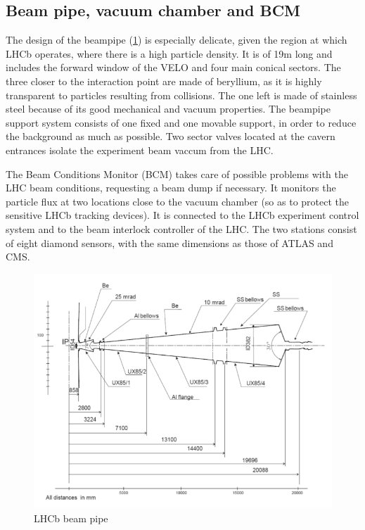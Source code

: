 \subsection{Beam pipe, vacuum chamber and BCM} %
The design of the beampipe (\ref{fig:beampipe}) is especially delicate, given the  region at which LHCb operates, where there is a high particle density. It is of 19m long and includes the forward window of the VELO and four main conical sectors. The three closer to the interaction point are made of beryllium, as it is highly transparent to particles resulting from collisions. The one left is made of stainless steel because of its good mechanical and vacuum properties. The beampipe support system consists of one fixed and one movable support, in order to reduce the background as much as possible. Two sector valves located at the cavern entrances isolate the experiment beam vaccum from the LHC.

The Beam Conditions Monitor (BCM) takes care of possible problems with the LHC beam conditions, requesting a beam dump if necessary. It monitors the particle flux at two locations close to the vacuum chamber (so as to protect the sensitive LHCb tracking devices). It is connected to the LHCb experiment control system and to the beam interlock controller of the LHC. The two stations consist of eight diamond sensors, with the same dimensions as those of ATLAS and CMS.
 
\begin{figure} [htb!]
\begin{center}
\includegraphics[scale=0.6]{figs/beampipe.png}
\caption{LHCb beam pipe \label{fig:beampipe}}
\end{center}
\end{figure}


